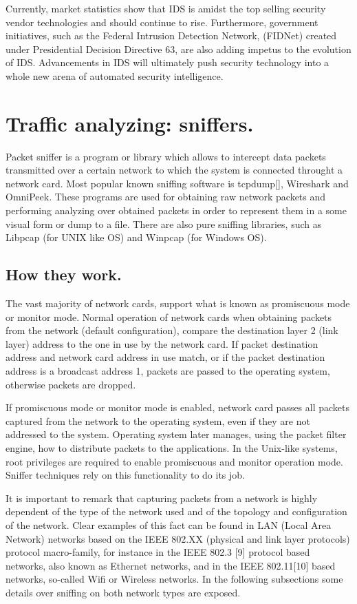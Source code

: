 \documentclass[thesis=M,english]{FITthesis}[2011/07/15]
\begin{document}
Currently, market statistics show that IDS is amidst the top selling security vendor technologies and should continue to rise. Furthermore, government initiatives, such as the Federal Intrusion Detection Network, (FIDNet) created under Presidential Decision Directive 63, are also adding impetus to the evolution of IDS. Advancements in IDS will ultimately push security technology into a whole new arena of automated security intelligence.

\section{Traffic analyzing: sniffers.}
Packet sniffer is a program or library which allows to intercept data packets transmitted over a certain network to which the system is connected throught a network card. Most popular known sniffing software is tcpdump[], Wireshark and OmniPeek. These programs are used for obtaining raw network packets and performing analyzing over obtained packets in order to represent them in a some visual form or dump to a file. There are also pure sniffing libraries, such as Libpcap (for UNIX like OS) and Winpcap (for Windows OS).

\subsection{How they work.}
The vast majority of network cards, support what is known as promiscuous mode or monitor mode. Normal operation of network cards when obtaining packets from the network (default configuration), compare the destination layer 2 (link layer) address to the one in use by the network card. If packet destination address and network card address in use match, or if the packet destination address is a broadcast address 1, packets are passed to the operating system, otherwise packets are dropped.

If promiscuous mode or monitor mode is enabled, network card passes all packets captured from the network to the operating system, even if they are not addressed to the system. Operating system later manages, using the packet filter engine, how to distribute packets to the applications. In the Unix-like systems, root privileges are required to enable promiscuous and monitor operation mode. Sniffer techniques rely on this functionality to do its job.

It is important to remark that capturing packets from a network is highly dependent of the type of the network used and of the topology and configuration of the network. Clear examples of this fact can be found in LAN (Local Area Network) networks based on the IEEE 802.XX (physical and link layer protocols) protocol macro-family, for instance in the IEEE 802.3 [9] protocol based networks, also known as Ethernet networks, and in the IEEE 802.11[10] based networks, so-called Wifi or Wireless networks. In the following subsections some details over sniffing on both network types are exposed.
\end{document}
